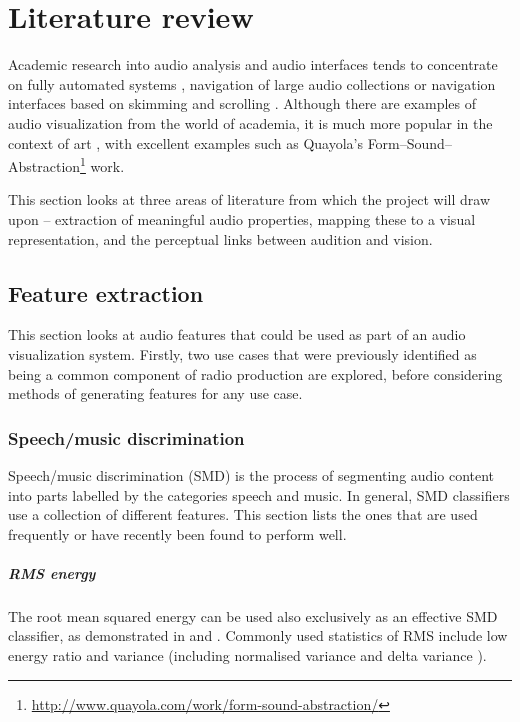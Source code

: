 \chapter{Literature review}\label{sec:litreview}

Academic research into audio analysis and audio interfaces tends to concentrate
on fully automated systems \cite{AngueraMiro2012}, navigation of large audio
collections \cite{FontCorbera2010} or navigation interfaces based on skimming
\cite{Arons1997} and scrolling \cite{Lee2007}. Although there are examples of
audio visualization from the world of academia, it is much more popular in the
context of art \cite{Armitage2012}, with excellent examples such as Quayola's
Form--Sound--Abstraction\footnote{\url{http://www.quayola.com/work/form-sound-abstraction/}}
work.

This section looks at three areas of literature from which the project will
draw upon -- extraction of meaningful audio properties, mapping these to a
visual representation, and the perceptual links between audition and vision.

\section{Feature extraction}\label{sec:litreviewfeats}
This section looks at audio features that could be used as part of an audio
visualization system. Firstly, two use cases that were previously identified as
being a common component of radio production are explored, before considering
methods of generating features for any use case.

\subsection{Speech/music discrimination}
Speech/music discrimination (SMD) is the process of segmenting audio content
into parts labelled by the categories speech and music. In general, SMD
classifiers use a collection of different features. This section lists the ones
that are used frequently or have recently been found to perform well.

\paragraph{RMS energy}
The root mean squared energy can be used also exclusively as an effective SMD
classifier, as demonstrated in \cite{Ericsson2009} and \cite{Panagiotakis2005}.
Commonly used statistics of RMS include low energy ratio
\cite{Liang2005,Ericsson2009,Saunders1996,Scheirer1997} and variance
\cite{Ericsson2009} (including normalised variance \cite{Panagiotakis2005} and
delta variance \cite{Carey1999}).

